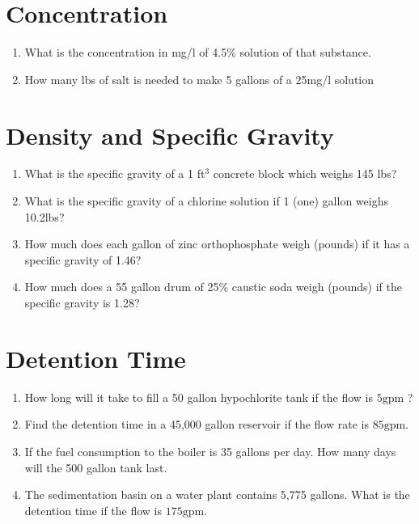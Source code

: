 \documentclass{article}
\begin{document}
\vspace{1cm}
\section{Concentration}
\begin{enumerate}
\item What is the concentration in mg/l of  4.5\% solution of that substance.

\item How many lbs of salt is needed to make 5 gallons of a 25mg/l solution

\end{enumerate}
\vspace{1cm}
\section{Density and Specific Gravity}
\begin{enumerate}

\item What is the specific gravity of a 1 ft$^3$ concrete block which weighs 145 lbs?

\item What is the specific gravity of a chlorine solution if 1 (one) gallon weighs 10.2lbs?

\item How much does each gallon of zinc orthophosphate weigh (pounds) if it has a specific gravity of 1.46?

\item How much does a 55 gallon drum of 25\% caustic soda weigh (pounds) if the specific gravity is 1.28?

\end{enumerate}

\vspace{1cm}
\section{Detention Time}
\begin{enumerate}



\item How long will it take to fill a 50 gallon hypochlorite tank if the flow is $5 \mathrm{gpm}$ ?

\item Find the detention time in a 45,000 gallon reservoir if the flow rate is $85 \mathrm{gpm}$.

\item If the fuel consumption to the boiler is 35 gallons per day. How many days will the 500 gallon tank last.

\item The sedimentation basin on a water plant contains 5,775 gallons. What is the detention time if the flow is $175 \mathrm{gpm}$.
\end{enumerate}
\end{document}
